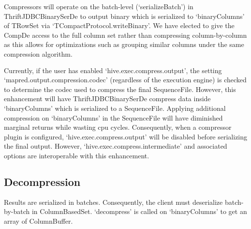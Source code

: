 \documentclass[11pt,a4paper]{article}
\begin{document}
		Compressors will operate on the batch-level (`serializeBatch') in ThriftJDBCBinarySerDe to output binary which is serialized to `binaryColumns' of TRowSet via `TCompactProtocol.writeBinary'.
		We have elected to give the CompDe access to the full column set rather than compressing column-by-column as this allows for optimizations such as grouping similar columns under the same compression algorithm.
		
		Currently, if the user has enabled `hive.exec.compress.output', the setting `mapred.output.compression.codec' (regardless of the execution engine) is checked to determine the codec used to compress the final SequenceFile.
		However, this enhancement will have ThriftJDBCBinarySerDe compress data inside `binaryColumns' which is serialized to a SequenceFile.
		Applying additional compression on `binaryColumns' in the SequenceFile will have diminished marginal returns while wasting cpu cycles.
		Consequently, when a compressor plugin is configured,  `hive.exec.compress.output' will be disabled before serializing the final output.
		However, `hive.exec.compress.intermediate' and associated options are interoperable with this enhancement.
		
	\subsection{Decompression}
	
		Results are serialized in batches.
		Consequently, the client must deserialize batch-by-batch in ColumnBasedSet.
		`decompress' is called on `binaryColumns' to get an array of ColumnBuffer.
		
\end{document}

